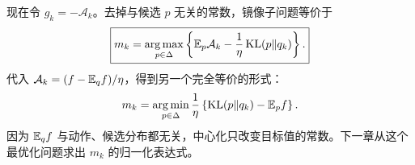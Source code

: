 现在令 $g_k=-\mathcal A_k$。去掉与候选 $p$ 无关的常数，镜像子问题等价于
\begin{equation}
\boxed{
m_k=\operatorname*{arg\,max}_{p\in\Delta}
\left\{\mathbb E_p\mathcal A_k-\frac1\eta\operatorname{KL}(p\Vert q_k)\right\}.
}
\label{eq:MD-advantage}
\end{equation}
代入 $\mathcal A_k=(f-\mathbb E_qf)/\eta$，得到另一个完全等价的形式：
\begin{equation}
m_k=\operatorname*{arg\,min}_{p\in\Delta}\frac1\eta
\left\{\operatorname{KL}(p\Vert q_k)-\mathbb E_pf\right\}.
\label{eq:MD-signal}
\end{equation}
因为 $\mathbb E_qf$ 与动作、候选分布都无关，中心化只改变目标值的常数。下一章从这个最优化问题求出 $m_k$ 的归一化表达式。
